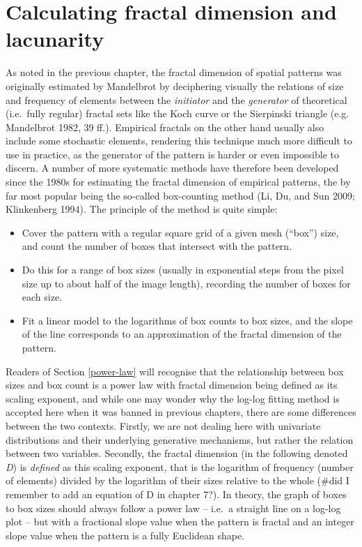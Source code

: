 \documentclass[
  12pt,
  a4paper, twoside]{book}
\begin{document}
\hypertarget{images-procedure}{%
\section{Calculating fractal dimension and lacunarity}\label{images-procedure}}

As noted in the previous chapter, the fractal dimension of spatial patterns was originally estimated by Mandelbrot by deciphering visually the relations of size and frequency of elements between the \emph{initiator} and the \emph{generator} of theoretical (i.e.~fully regular) fractal sets like the Koch curve or the Sierpinski triangle (e.g. Mandelbrot 1982, 39 ff.). Empirical fractals on the other hand usually also include some stochastic elements, rendering this technique much more difficult to use in practice, as the generator of the pattern is harder or even impossible to discern. A number of more systematic methods have therefore been developed since the 1980s for estimating the fractal dimension of empirical patterns, the by far most popular being the so-called box-counting method (Li, Du, and Sun 2009; Klinkenberg 1994). The principle of the method is quite simple:

\begin{itemize}
\item
  Cover the pattern with a regular square grid of a given mesh (``box'') size, and count the number of boxes that intersect with the pattern.
\item
  Do this for a range of box sizes (usually in exponential steps from the pixel size up to about half of the image length), recording the number of boxes for each size.
\item
  Fit a linear model to the logarithms of box counts to box sizes, and the slope of the line corresponds to an approximation of the fractal dimension of the pattern.
\end{itemize}

Readers of Section \ref{power-law} will recognise that the relationship between box sizes and box count is a power law with fractal dimension being defined as its scaling exponent, and while one may wonder why the log-log fitting method is accepted here when it was banned in previous chapters, there are some differences between the two contexts. Firstly, we are not dealing here with univariate distributions and their underlying generative mechanisms, but rather the relation between two variables. Secondly, the fractal dimension (in the following denoted \emph{D}) is \emph{defined} as this scaling exponent, that is the logarithm of frequency (number of elements) divided by the logarithm of their sizes relative to the whole (\#did I remember to add an equation of D in chapter 7?). In theory, the graph of boxes to box sizes should always follow a power law -- i.e.~a straight line on a log-log plot -- but with a fractional slope value when the pattern is fractal and an integer slope value when the pattern is a fully Euclidean shape.
\end{document}
